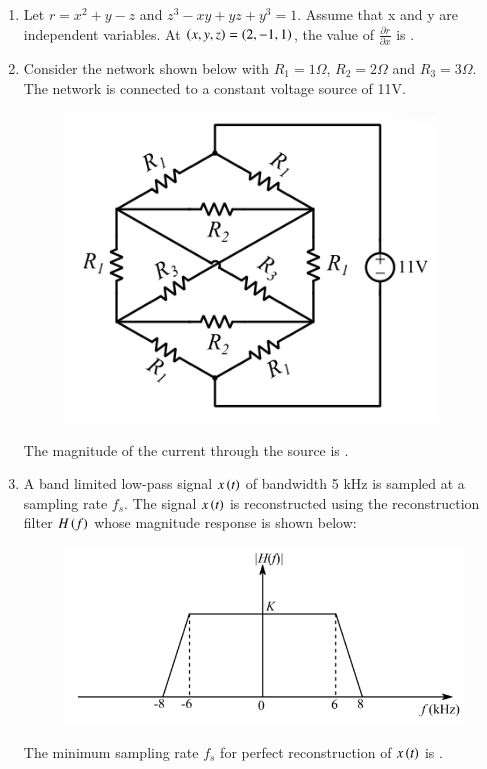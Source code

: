 \documentclass[a4paper, 11pt]{article}
\begin{document}
\begin{enumerate}
    \hfill{}

    \item Let $r = x^2+y-z$ and $z^3-xy+yz+y^3=1$. Assume that x and y are independent variables. At $\left(x,y,z\right)=\left(2,-1,1\right)$, the value  of $\frac{\partial r}{\partial x}$ is \underline{\hspace{2cm}}.
    
    \hfill{}

    \item Consider the network shown below with $R_1=1\Omega$, $R_2=2\Omega$ and $R_3=3\Omega$. The network is connected to a constant voltage source of 11V.
    \begin{figure}[H]
        \centering
        \includegraphics[width=0.5\columnwidth]{figs/q53.png}
        \caption*{}
        \label{fig:q53}
    \end{figure}
    The magnitude of the current  through the source is \underline{\hspace{2cm}}.
    
    \hfill{}

    \item A band limited low-pass signal $x\left(t\right)$ of bandwidth 5 kHz is sampled at a sampling rate $f_s$. The signal $x\left(t\right)$ is reconstructed using the reconstruction filter $H\left(f\right)$ whose magnitude response is shown below:
    \begin{figure}[H]
        \centering
        \includegraphics[width=0.6\columnwidth]{figs/q54.png}
        \caption*{}
        \label{fig:q54}
    \end{figure}
    The minimum sampling rate $f_s$  for perfect reconstruction of $x\left(t\right)$ is \underline{\hspace{2cm}}.


\end{enumerate}
\end{document}
